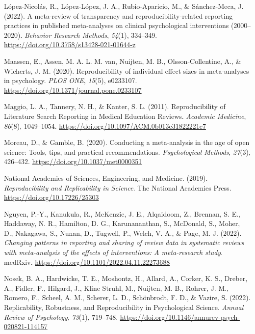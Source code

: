 \documentclass[
  ,apa7,floatsintext]{apa6}
\newlength{\cslhangindent}
\newlength{\cslentryspacingunit} %
\newenvironment{CSLReferences}[2] %
 {%
  \setlength{\parindent}{0pt}
  \ifodd #1
  \let\oldpar\par
  \def\par{\hangindent=\cslhangindent\oldpar}
  \fi
  \setlength{\parskip}{#2\cslentryspacingunit}
 }%
 {}
\begin{document}
\begin{CSLReferences}{1}{0}
\leavevmode{}%
López-Nicolás, R., López-López, J. A., Rubio-Aparicio, M., \& Sánchez-Meca, J. (2022). A meta-review of transparency and reproducibility-related reporting practices in published meta-analyses on clinical psychological interventions (2000--2020). \emph{Behavior Research Methods}, \emph{54}(1), 334--349. \url{https://doi.org/10.3758/s13428-021-01644-z}

\leavevmode{}%
Maassen, E., Assen, M. A. L. M. van, Nuijten, M. B., Olsson-Collentine, A., \& Wicherts, J. M. (2020). Reproducibility of individual effect sizes in meta-analyses in psychology. \emph{PLOS ONE}, \emph{15}(5), e0233107. \url{https://doi.org/10.1371/journal.pone.0233107}

\leavevmode{}%
Maggio, L. A., Tannery, N. H., \& Kanter, S. L. (2011). Reproducibility of {Literature} {Search} {Reporting} in {Medical} {Education} {Reviews}. \emph{Academic Medicine}, \emph{86}(8), 1049--1054. \url{https://doi.org/10.1097/ACM.0b013e31822221e7}

\leavevmode{}%
Moreau, D., \& Gamble, B. (2020). Conducting a meta-analysis in the age of open science: Tools, tips, and practical recommendations. \emph{Psychological Methods}, \emph{27}(3), 426--432. \url{https://doi.org/10.1037/met0000351}

\leavevmode{}%
National Academies of Sciences, Engineering, and Medicine. (2019). \emph{Reproducibility and {Replicability} in {Science}}. {The National Academies Press}. \url{https://doi.org/10.17226/25303}

\leavevmode{}%
Nguyen, P.-Y., Kanukula, R., McKenzie, J. E., Alqaidoom, Z., Brennan, S. E., Haddaway, N. R., Hamilton, D. G., Karunananthan, S., McDonald, S., Moher, D., Nakagawa, S., Nunan, D., Tugwell, P., Welch, V. A., \& Page, M. J. (2022). \emph{Changing patterns in reporting and sharing of review data in systematic reviews with meta-analysis of the effects of interventions: A meta-research study}. medRxiv. \url{https://doi.org/10.1101/2022.04.11.22273688}

\leavevmode{}%
Nosek, B. A., Hardwicke, T. E., Moshontz, H., Allard, A., Corker, K. S., Dreber, A., Fidler, F., Hilgard, J., Kline Struhl, M., Nuijten, M. B., Rohrer, J. M., Romero, F., Scheel, A. M., Scherer, L. D., Schönbrodt, F. D., \& Vazire, S. (2022). Replicability, {Robustness}, and {Reproducibility} in {Psychological Science}. \emph{Annual Review of Psychology}, \emph{73}(1), 719--748. \url{https://doi.org/10.1146/annurev-psych-020821-114157}


\end{CSLReferences}
\end{document}
